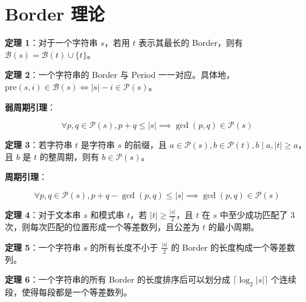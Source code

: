 \section{Border 理论}

\begin{tcolorbox}
\textbf{定理 1}：对于一个字符串 $s$，若用 $t$ 表示其最长的 Border，则有 $\mathcal{B}(s) = \mathcal{B}(t) \cup \{t\}$。
\end{tcolorbox}

\begin{tcolorbox}
\textbf{定理 2}：一个字符串的 Border 与 Period 一一对应。具体地，$\mathrm{pre}(s, i) \in \mathcal{B}(s) \iff |s| - i \in \mathcal{P}(s)$。
\end{tcolorbox}

\begin{tcolorbox}
\textbf{弱周期引理}：

$$
\forall p, q\in\mathcal{P}(s), p + q \le |s| \implies \gcd(p, q)\in\mathcal{P}(s)
$$
\end{tcolorbox}

\begin{tcolorbox}
\textbf{定理 3}：若字符串 $t$ 是字符串 $s$ 的前缀，且 $a \in \mathcal{P}(s), b \in \mathcal{P}(t), b \mid a, |t| \ge a$，且 $b$ 是 $t$ 的整周期，则有 $b \in \mathcal{P}(s)$。
\end{tcolorbox}

\begin{tcolorbox}
\textbf{周期引理}：

$$
\forall p, q\in\mathcal{P}(s), p + q - \gcd(p, q) \le |s| \implies \gcd(p, q)\in\mathcal{P}(s)
$$
\end{tcolorbox}

\begin{tcolorbox}
\textbf{定理 4}：对于文本串 $s$ 和模式串 $t$，若 $|t| \ge \frac{|s|}{2}$，且 $t$ 在 $s$ 中至少成功匹配了 $3$ 次，则每次匹配的位置形成一个等差数列，且公差为 $t$ 的最小周期。
\end{tcolorbox}

\begin{tcolorbox}
\textbf{定理 5}：一个字符串 $s$ 的所有长度不小于 $\frac{|s|}{2}$ 的 Border 的长度构成一个等差数列。
\end{tcolorbox}

\begin{tcolorbox}
\textbf{定理 6}：一个字符串的所有 Border 的长度排序后可以划分成 $\lceil\log_2|s|\rceil$ 个连续段，使得每段都是一个等差数列。
\end{tcolorbox}


